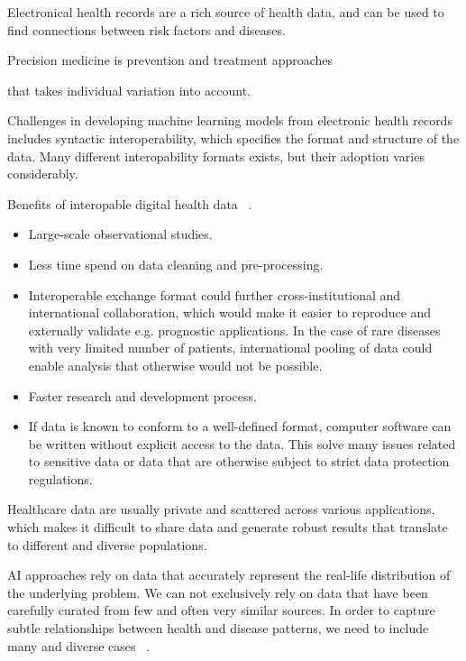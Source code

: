 Electronical health records are a rich source of health data,
and can be used to find connections between risk factors and diseases.

Precision medicine is prevention and treatment approaches

that takes individual variation into account.


Challenges in developing machine learning models from electronic health records
includes syntactic interoperability, 
which specifies the format and structure of the data.
Many different interopability formats exists, 
but their adoption varies considerably.

Benefits of interopable digital health data
~\autocite{lehneWhy2019}.

\begin{itemize}
    \item Large-scale observational studies.
    \item Less time spend on data cleaning and pre-processing.
    \item Interoperable exchange format could further cross-institutional
    and international collaboration, which would make it easier 
    to reproduce and externally validate e.g. prognostic applications.
    In the case of rare diseases with very limited number of patients, 
    international pooling of data could enable analysis
    that otherwise would not be possible.
    \item Faster research and development process.
    \item If data is known to conform to a well-defined format,
    computer software can be written without explicit access to the data.
    This solve many issues related to sensitive data or
    data that are otherwise subject to strict data protection regulations.
\end{itemize}

Healthcare data are usually private and scattered across various applications,
which makes it difficult to share data and generate robust results 
that translate to different and diverse populations.

AI approaches rely on data that accurately represent
the real-life distribution of the underlying problem.
We can not exclusively rely on data that have been carefully curated 
from few and often very similar sources. 
In order to capture subtle relationships 
between health and disease patterns,
we need to include many and diverse cases~%
\autocite{riekeFuture2020}.


